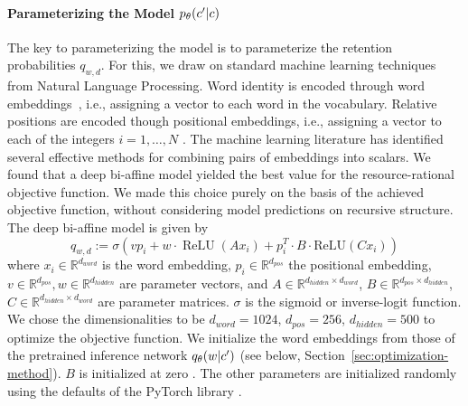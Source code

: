 \paragraph{Parameterizing the Model $p_\theta(c'|c)$}
The key to parameterizing the model is to parameterize the retention probabilities $q_{w,d}$.
For this, we draw on standard machine learning techniques from Natural Language Processing.
Word identity is encoded through word embeddings~\citep{DBLP:series/synthesis/2017Goldberg}, i.e., assigning a vector to each word in the vocabulary.
Relative positions are encoded though positional embeddings, i.e., assigning a vector to each of the integers $i = 1, \dots, N$  \citep{vaswani2017attention}.
The machine learning literature has identified several effective methods for combining pairs of embeddings into scalars.
We found that a deep bi-affine model \citep{Dozat2017DeepBA} yielded the best value for the resource-rational objective function.
We made this choice purely on the basis of the achieved objective function, without considering model predictions on recursive structure.
The deep bi-affine model is given by
\begin{equation}\label{eq:biaffine}
q_{w,d} := \sigma\left(  v p_i + w \cdot \operatorname{ReLU}(A x_i) + p_i^T \cdot B \cdot \text{ReLU}(C x_i)\right)
\end{equation}
where $x_i \in \mathbb{R}^{d_{word}}$ is the word embedding, $p_i \in \mathbb{R}^{d_{pos}}$ the positional embedding, $v \in \mathbb{R}^{d_{pos}}, w \in \mathbb{R}^{d_{hidden}}$ are parameter vectors, and
$A \in \mathbb{R}^{d_{hidden} \times d_{word}}$,
$B \in \mathbb{R}^{d_{pos} \times d_{hidden}}$,
$C \in \mathbb{R}^{d_{hidden} \times d_{word}}$ are parameter matrices.
$\sigma$ is the sigmoid or inverse-logit function.
We chose the dimensionalities to be $d_{word} = 1024$, $d_{pos} = 256$, $d_{hidden} = 500$ to optimize the objective function.
We initialize the word embeddings from those of the pretrained inference network $q_\theta(w|c')$ (see below, Section~\ref{sec:optimization-method}).
$B$ is initialized at zero \citep{Dozat2017DeepBA}.
The other parameters are initialized randomly using the defaults of the PyTorch library \citep{Paszke2019PyTorchAI}.

